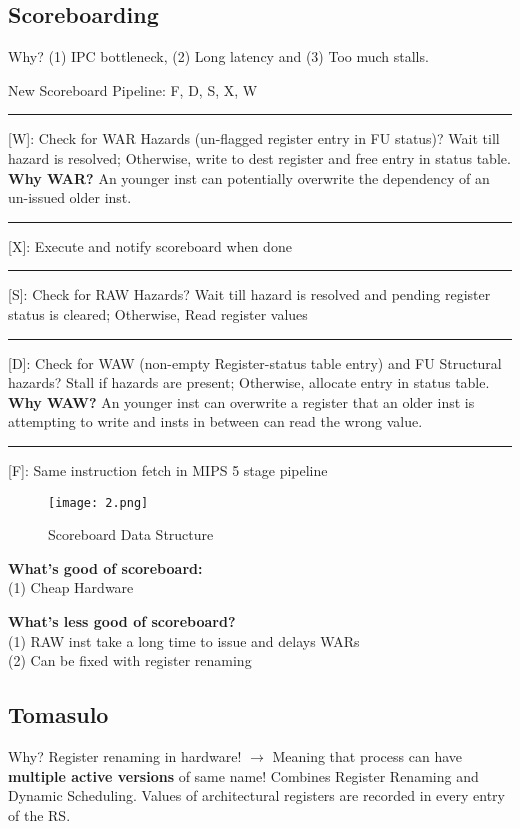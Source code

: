 \documentclass{article}
\begin{document}
\begin{multicols*}{2}
\subsection*{Scoreboarding}
Why? (1) IPC bottleneck, (2) Long latency and (3) Too much stalls. \medskip\par\noindent
New Scoreboard Pipeline: F, D, S, X, W \\
\smallskip\hrule\smallskip\noindent
{[W]}: Check for WAR Hazards (un-flagged register entry in FU status)? Wait till hazard is resolved; Otherwise, write to dest register and free entry in status table. \textbf{Why WAR?} An younger inst can potentially overwrite the dependency of an un-issued older inst. \\
\smallskip\hrule\smallskip\noindent
{[X]}: Execute and notify scoreboard when done \\
\smallskip\hrule\smallskip\noindent
{[S]}: Check for RAW Hazards? Wait till hazard is resolved and pending register status is cleared; Otherwise, Read register values \\
\smallskip\hrule\smallskip\noindent
{[D]}: Check for WAW (non-empty Register-status table entry) and FU Structural hazards? Stall if hazards are present; Otherwise, allocate entry in status table. \textbf{Why WAW?} An younger inst can overwrite a register that an older inst is attempting to write and insts in between can read the wrong value.\\
\smallskip\hrule\smallskip\noindent
{[F]}: Same instruction fetch in MIPS 5 stage pipeline

\begin{figure}[H]
  \centering
    {\texttt{[image: 2.png]}}
  \caption{Scoreboard Data Structure}
\end{figure}

\medskip\par\noindent
\textbf{What's good of scoreboard:} \\
(1) Cheap Hardware \\
\medskip\par\noindent
\textbf{What's less good of scoreboard?} \\
(1) RAW inst take a long time to issue and delays WARs \\
(2) Can be fixed with register renaming


\subsection*{Tomasulo}
Why? Register renaming in hardware! $\rightarrow$ Meaning that process can have \textbf{multiple active versions} of same name! Combines Register Renaming and Dynamic Scheduling. Values of architectural registers are recorded in every entry of the RS.
\medskip\par\noindent


\end{multicols*}
\end{document}
